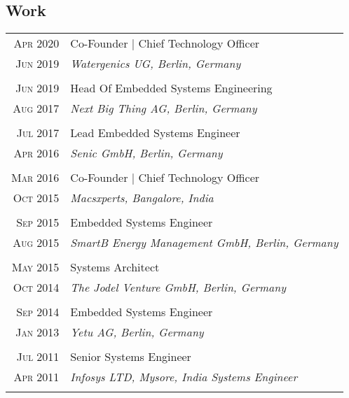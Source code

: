 \subsection{Work}
\begin{longtable}
	{r|p{12cm}}

	\textsc{Apr 2020} & Co-Founder | Chief Technology Officer\\
	\textsc{Jun 2019}&\emph{Watergenics UG, Berlin, Germany}\\
	\multicolumn{2}{c}{} \\

	\textsc{Jun 2019} & Head Of Embedded Systems Engineering\\
	\textsc{Aug 2017}&\emph{Next Big Thing AG, Berlin, Germany}\\
	\multicolumn{2}{c}{} \\

	\textsc{Jul 2017} & Lead Embedded Systems Engineer\\
	\textsc{Apr 2016}&\emph{Senic GmbH, Berlin, Germany}\\
	\multicolumn{2}{c}{} \\

	\textsc{Mar 2016} & Co-Founder | Chief Technology Officer\\
	\textsc{Oct 2015}&\emph{Macsxperts, Bangalore, India}\\
	\multicolumn{2}{c}{} \\

	\textsc{Sep 2015} & Embedded Systems Engineer\\
	\textsc{Aug 2015}&\emph{SmartB Energy Management GmbH, Berlin, Germany	}\\
	\multicolumn{2}{c}{} \\

	\textsc{May 2015} & Systems Architect\\
	\textsc{Oct 2014}&\emph{The Jodel Venture GmbH, Berlin, Germany	}\\
	\multicolumn{2}{c}{} \\

	\textsc{Sep 2014} & Embedded Systems Engineer\\
	\textsc{Jan 2013} &\emph{Yetu AG, Berlin, Germany	}\\
	\multicolumn{2}{c}{} \\

	\textsc{Jul 2011} & Senior Systems Engineer \\
	\textsc{Apr 2011} &\emph{Infosys LTD, Mysore, India	Systems Engineer}\\
	\multicolumn{2}{c}{} \\


\end{longtable}
